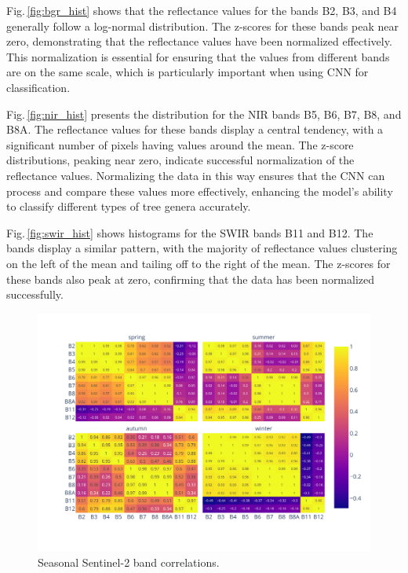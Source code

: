 Fig.\,\ref{fig:bgr_hist} shows that the reflectance values for the bands B2, B3, and B4 generally follow a log-normal distribution. The z-scores for these bands peak near zero, demonstrating that the reflectance values have been normalized effectively. This normalization is essential for ensuring that the values from different bands are on the same scale, which is particularly important when using CNN for classification.

Fig.\,\ref{fig:nir_hist} presents the distribution for the NIR bands B5, B6, B7, B8, and B8A. The reflectance values for these bands display a central tendency, with a significant number of pixels having values around the mean. The z-score distributions, peaking near zero, indicate successful normalization of the reflectance values. Normalizing the data in this way ensures that the CNN can process and compare these values more effectively, enhancing the model's ability to classify different types of tree genera accurately.

Fig.\,\ref{fig:swir_hist} shows histograms for the SWIR bands B11 and B12. The bands display a similar pattern, with the majority of reflectance values clustering on the left of the mean and tailing off to the right of the mean. The z-scores for these bands also peak at zero, confirming that the data has been normalized successfully. 


\begin{figure}[ht]
    \centering
    \includegraphics[width=0.9\linewidth, trim={40pt 40pt 10pt 30pt}, clip]{figures/figures_features/season_correlation.pdf}
    \caption{Seasonal Sentinel-2 band correlations.}
    \label{fig:season_correlation}
\end{figure}

